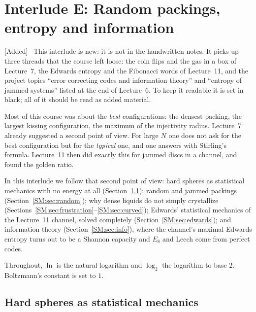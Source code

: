 \documentclass[11pt,openany]{book}
\theoremstyle{plain}
\theoremstyle{definition}
\theoremstyle{remark}
\newenvironment{addedblock}{\par\color{addcol}\noindent\textsf{\small[Added]}\ }{\par}
\begin{document}
\chapter[Interlude E: Entropy and information]{Interlude E: Random packings, entropy and information}
\label{SM:ch}

\begin{addedblock}
This interlude is new: it is not in the handwritten notes. It picks up three threads that the course
left loose: the coin flips and the gas in a box of Lecture~7, the Edwards entropy and the Fibonacci
words of Lecture~11, and the project topics ``error correcting codes and information theory'' and
``entropy of jammed systems'' listed at the end of Lecture~6. To keep it readable it is set in black;
all of it should be read as added material.
\end{addedblock}

Most of this course was about the \emph{best} configurations: the densest packing, the largest
kissing configuration, the maximum of the injectivity radius. Lecture~7 already suggested a second
point of view. For large $N$ one does not ask for the best configuration but for the \emph{typical}
one, and one answers with Stirling's formula. Lecture~11 then did exactly this for jammed discs in a
channel, and found the golden ratio.

In this interlude we follow that second point of view: hard spheres as statistical mechanics with no
energy at all (Section~\ref{SM:sec:hard}); random and jammed packings (Section~\ref{SM:sec:random}); why
dense liquids do not simply crystallize (Sections~\ref{SM:sec:frustration}--\ref{SM:sec:curved}); Edwards'
statistical mechanics of the Lecture~11 channel, solved completely (Section~\ref{SM:sec:edwards}); and
information theory (Section~\ref{SM:sec:info}), where the channel's maximal Edwards entropy turns out to
be a Shannon capacity and $E_8$ and Leech come from perfect codes.

Throughout, $\ln$ is the natural logarithm and $\log_2$ the logarithm to base $2$. Boltzmann's constant
is set to $1$.

\section{Hard spheres as statistical mechanics}
\label{SM:sec:hard}
\end{document}
